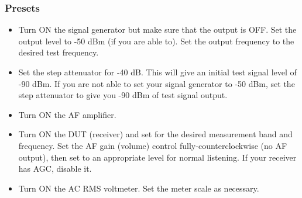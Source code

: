\documentclass[10pt,letterpaper]{book}
\begin{document}
\subsubsection*{Presets}
\begin{itemize}
	\item Turn ON the signal generator but make sure that the output is OFF. Set the output level to -50 dBm (if you are able to). Set the output frequency to the desired test frequency.
	\item Set the step attenuator for -40 dB. This will give an initial test signal level of -90 dBm. If you are not able to set your signal generator to -50 dBm, set the step attenuator to give you -90 dBm of test signal output.
	\item Turn ON the AF amplifier.
	\item Turn ON the DUT (receiver) and set for the desired measurement band and frequency. Set the AF gain (volume) control fully-counterclockwise (no AF output), then set to an appropriate level for normal listening. If your receiver has AGC, disable it.
	\item Turn ON the AC RMS voltmeter. Set the meter scale as necessary.
\end{itemize}
\end{document}
